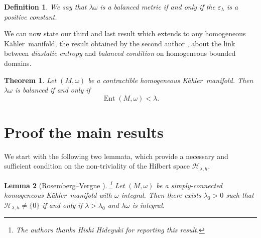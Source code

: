 \documentclass[reqno]{amsart}
\newtheorem{thm}{Theorem}[section]
\newtheorem{lem}[thm]{Lemma}
\newtheorem*{defni}{Definition}
\begin{document}
\begin{defni}
 We say that $\lambda\omega$ is a  \emph{balanced metric} if and only if the $\varepsilon_{\lambda}$ is a \emph{positive constant}.
 \end{defni}

We can now state our  third and last result which  extends to any homogeneous {K\"{a}hler}\ manifold, the result obtained by the second author \cite[Theorem 2]{M04}, about the link between \emph{diastatic entropy} and \emph{balanced condition} on homogeneous bounded domains.  

\begin{thm}\label{THM05}
Let $(M,\omega)$ be a contractible homogeneous {K\"{a}hler}\ manifold. Then ${\lambda} \omega$ is balanced if and only if 
\begin{equation}
{\operatorname{Ent}}(M,\omega)<{\lambda}.
\end{equation}
\end{thm}

\section{Proof the main results}
We start with the following two lemmata, which provide a necessary and sufficient condition on the non-triviality of the Hilbert space ${\mathcal{H}}_{{\lambda}, h}$.\begin{lem}[Rosemberg--Vergne \cite{rosenberg}]\label{lemrose}\footnote{The authors thanks Hishi Hideyuki for reporting this result.}
Let $(M, \omega)$ be a simply-connected homogeneous {K\"{a}hler}\ manifold with $\omega$ integral. Then there exists $\lambda_0>0$ such that  
${\mathcal{H}}_{{\lambda}, h}\neq \{0\}$ if and only if $\lambda >  \lambda_0$ and ${\lambda} \omega$ is integral.
\end{lem}
\end{document}
